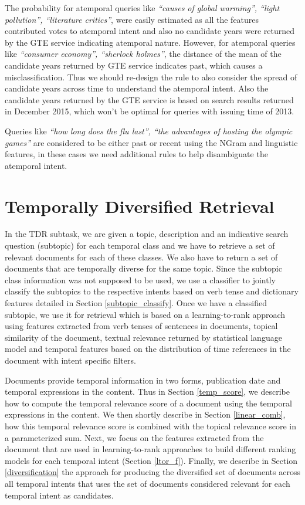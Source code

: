 \documentclass{sig-alternate}
\begin{document}
The probability for atemporal queries like \textit{``causes of global warming'', ``light pollution'', ``literature critics''}, were easily estimated as all the features contributed votes to atemporal intent and also no candidate years were returned by the \textsf{GTE service} indicating atemporal nature. However, for atemporal queries like \textit{``consumer economy'', ``sherlock holmes''}, the distance of the mean of the candidate years returned by \textsf{GTE service} indicates past, which causes a misclassification. Thus we should re-design the rule to also consider the spread of candidate years across time to understand the atemporal intent. Also the candidate years returned by the \textsf{GTE service} is based on search results returned in December 2015, which won't be optimal for queries with issuing time of 2013.

Queries like \textit{``how long does the flu last'', ``the advantages of hosting the olympic games''} are considered to be either past or recent using the \textsf{NGram} and \textsf{linguistic} features, in these cases we need additional rules to help disambiguate the atemporal intent. 

\section{Temporally Diversified Retrieval}\label{TDR}
In the TDR subtask, we are given a topic, description and an indicative search question (subtopic) for each temporal class and we have to retrieve a set of relevant documents for each of these classes. We also have to return a set of documents that are temporally diverse for the same topic. Since the subtopic class information was not supposed to be used, we use a classifier to jointly classify the subtopics to the respective intents based on verb tense and dictionary features detailed in Section \ref{subtopic_classify}. Once we have a classified subtopic, we use it for retrieval which is based on a \textsf{learning-to-rank} approach using features extracted from verb tenses of sentences in documents, topical similarity of the document, textual relevance returned by statistical language model and temporal features based on the distribution of time references in the document with intent specific filters.

Documents provide temporal information in two forms, publication date and temporal expressions in the content. Thus in Section \ref{temp_score}, we describe how to compute the temporal relevance score of a document using the temporal expressions in the content. We then shortly describe in Section \ref{linear_comb}, how this temporal relevance score is combined with the topical relevance score in a parameterized sum. Next, we focus on the features extracted from the document that are used in learning-to-rank approaches to build different ranking models for each temporal intent (Section \ref{ltor_f}). Finally, we describe in Section \ref{diversification} the approach for producing the diversified set of documents across all temporal intents that uses the set of documents considered relevant for each temporal intent as candidates. 
\end{document}
